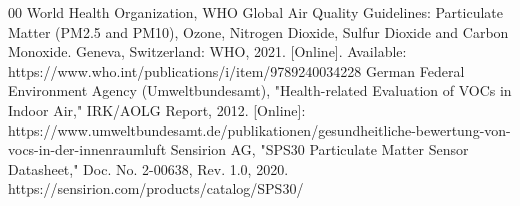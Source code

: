 \documentclass[conference]{IEEEtran}
\begin{document}
\begin{thebibliography}{00}
 World Health Organization, WHO Global Air Quality Guidelines: Particulate Matter (PM2.5 and PM10), Ozone, Nitrogen Dioxide, Sulfur Dioxide and Carbon Monoxide. Geneva, Switzerland: WHO, 2021. [Online]. Available: https://www.who.int/publications/i/item/9789240034228
 German Federal Environment Agency (Umweltbundesamt), "Health-related Evaluation of VOCs in Indoor Air," IRK/AOLG Report, 2012. [Online]: https://www.umweltbundesamt.de/publikationen/gesundheitliche-bewertung-von-vocs-in-der-innenraumluft
 Sensirion AG, "SPS30 Particulate Matter Sensor Datasheet," Doc. No. 2-00638, Rev. 1.0, 2020. https://sensirion.com/products/catalog/SPS30/

\end{thebibliography}
\end{document}
